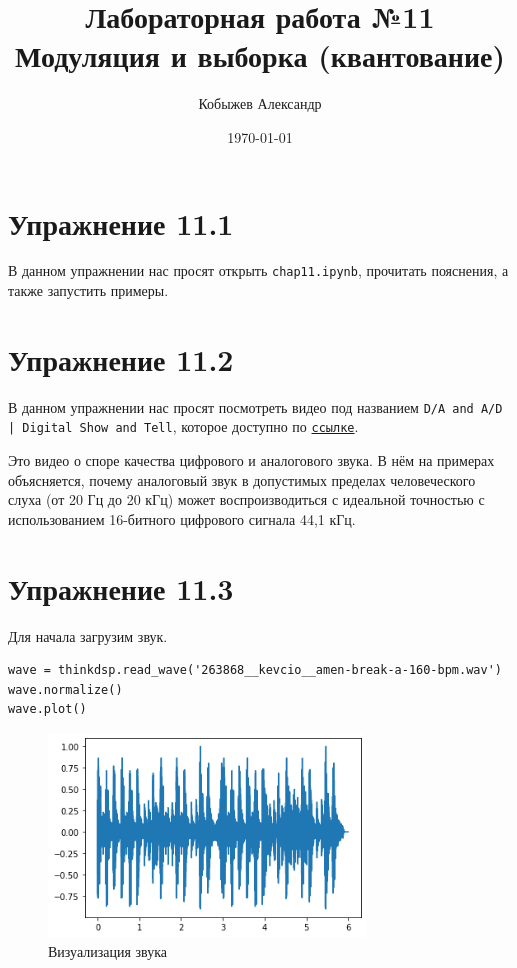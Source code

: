 \documentclass[a4paper,12pt]{report}
\title{Лабораторная работа №11\\Модуляция и выборка (квантование)}
\author{Кобыжев Александр}
\date{\today}
\begin{document}
\maketitle
\tableofcontents
\listoffigures
\lstlistoflistings

\maketitle

\chapter{Упражнение 11.1}

В данном упражнении нас просят открыть \texttt{chap11.ipynb}, прочитать пояснения, а также запустить примеры.

\chapter{Упражнение 11.2}

В данном упражнении нас просят посмотреть видео под названием \texttt{D/A and A/D | Digital Show and Tell}, которое доступно по \href{https://www.youtube.com/watch?v=cIQ9IXSUzuM}{\texttt{ссылке}}.

Это видео о споре качества цифрового и аналогового звука. В нём на примерах объясняется, почему аналоговый звук в допустимых пределах человеческого слуха (от 20 Гц до 20 кГц) может воспроизводиться с идеальной точностью с использованием 16-битного цифрового сигнала 44,1 кГц.

\chapter{Упражнение 11.3}

Для начала загрузим звук.

\begin{lstlisting}[caption=Загрузка звука]
wave = thinkdsp.read_wave('263868__kevcio__amen-break-a-160-bpm.wav')
wave.normalize()
wave.plot()
\end{lstlisting}

\begin{figure}[H]
        \centering
        \includegraphics[width=0.75\textwidth]{lab11_fig3_1.png}
        \caption{Визуализация звука}
        \label{fig:lab11_fig3_1}
\end{figure}
\end{document}
